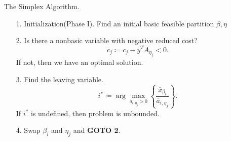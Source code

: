 \begin{prev}
	The Simplex Algorithm.
	\begin{enumerate}
		\item[1.] Initialization(Phase I). Find an initial basic feasible partition \(\beta, \eta\)
		\item[2.] Is there a nonbasic variable with negative reduced cost?
			\[
				\overline{c}_j \coloneqq c_{j} - \overline{y}^{T}A_{\eta_{j}}<0.
			\]
			If not, then we have an optimal solution.
		\item[3.] Find the leaving variable.
			\[
				i^{*} \coloneqq \arg\max_{\overline{a}_{i, \eta_{j}}>0} {\left\{\frac{\overline{x}_{\beta_{i}}}{\overline{a}_{i, \eta_{j}}}\right\}}.
			\]
			If \(i^{*}\) is undefined, then problem is unbounded.
		\item[4.] Swap \(\beta_{i}\) and \(\eta_{j}\) and \textbf{GOTO 2}.
	\end{enumerate}
\end{prev}

